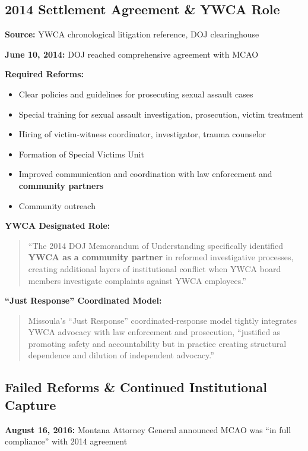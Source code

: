 \documentclass[11pt,letterpaper]{article}
\newenvironment{testimony}{%
    \begin{quote}\itshape\color{DarkGray}%
}{%
    \end{quote}%
}
\begin{document}
\subsection{2014 Settlement Agreement \& YWCA Role}

\textbf{Source:} YWCA chronological litigation reference, DOJ clearinghouse

\textbf{June 10, 2014:} DOJ reached comprehensive agreement with MCAO

\textbf{Required Reforms:}
\begin{itemize}[leftmargin=*]
\item Clear policies and guidelines for prosecuting sexual assault cases
\item Special training for sexual assault investigation, prosecution, victim treatment
\item Hiring of victim-witness coordinator, investigator, trauma counselor
\item Formation of Special Victims Unit
\item Improved communication and coordination with law enforcement and \textbf{community partners}
\item Community outreach
\end{itemize}

\textbf{YWCA Designated Role:}
\begin{testimony}
``The 2014 DOJ Memorandum of Understanding specifically identified \textbf{YWCA as a community partner} in reformed investigative processes, creating additional layers of institutional conflict when YWCA board members investigate complaints against YWCA employees.''
\end{testimony}

\textbf{``Just Response'' Coordinated Model:}
\begin{testimony}
Missoula's ``Just Response'' coordinated-response model tightly integrates YWCA advocacy with law enforcement and prosecution, ``justified as promoting safety and accountability but in practice creating structural dependence and dilution of independent advocacy.''
\end{testimony}

\subsection{Failed Reforms \& Continued Institutional Capture}

\textbf{August 16, 2016:} Montana Attorney General announced MCAO was ``in full compliance'' with 2014 agreement
\end{document}
